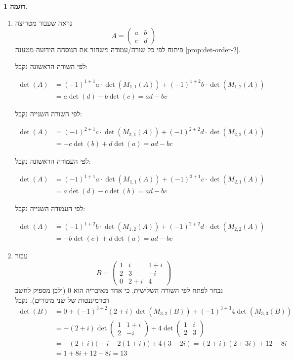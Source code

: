 \documentclass[12pt]{report}
\theoremstyle{plain}
\theoremstyle{definition}
\newtheorem{example}{דוגמה}[chapter]
\newcommand{\0}{\mathbf{0}}
\begin{document}
\begin{example}\
\begin{enumerate}[label=\alph*.]
\item 
נראה שעבור מטריצה
$$
A=\begin{pmatrix}
a & b \\
c & d
\end{pmatrix}
$$
פיתוח לפי כל שורה/עמודה משחזר את הנוסחה הידועה מטענה
\ref{prop:det-order-2}.

לפי השורה הראשונה נקבל:

$$
\begin{aligned}
\det(A)&=(-1)^{1+1}a\cdot \det(M_{1,1}(A))+(-1)^{1+2}b\cdot \det(M_{1,2}(A))\\
&=a\det(d)-b\det(c)=ad-bc
\end{aligned}
$$

לפי השורה השנייה נקבל:

$$
\begin{aligned}
\det(A)&=(-1)^{2+1}c\cdot \det(M_{2,1}(A))+(-1)^{2+2}d\cdot \det(M_{2,2}(A))\\
&=-c\det(b)+d\det(a)=ad-bc
\end{aligned}
$$

לפי העמודה הראשונה נקבל:

$$
\begin{aligned}
\det(A)&=(-1)^{1+1}a\cdot \det(M_{1,1}(A))+(-1)^{2+1}c\cdot \det(M_{2,1}(A))\\
&=a\det(d)-c\det(b)=ad-bc
\end{aligned}
$$

לפי העמודה השנייה נקבל:

$$
\begin{aligned}
\det(A)&=(-1)^{1+2}b\cdot \det(M_{1,2}(A))+(-1)^{2+2}d\cdot \det(M_{2,2}(A))\\
&=-b\det(c)+d\det(a)=ad-bc
\end{aligned}
$$

\item 
עבור
$$
B=\begin{pmatrix}
1 & i & 1+i \\
2 & 3 & -i \\
0 & 2+i & 4
\end{pmatrix}
$$
נבחר לפתח לפי השורה השלישית, כי אחד מאיבריה הוא 
$0$
(ולכן מספיק לחשב דטרמיננטות של שני מינורים). נקבל
$$
\begin{aligned}
\det(B)&=0+(-1)^{3+2}(2+i)\det(M_{3,2}(B))+(-1)^{3+3}4\det(M_{3,3}(B)) \\
&=-(2+i)\det\!\begin{pmatrix}
1 & 1+i \\
2 & -i
\end{pmatrix}+4\det\!\begin{pmatrix}
1 & i \\
2 & 3
\end{pmatrix}\\
&=-(2+i)\bigl(-i-2(1+i)\bigr)+4(3-2i)=(2+i)(2+3i)+12-8i\\
&=1+8i+12-8i=13
\end{aligned}
$$


\end{enumerate}
\end{example}
\end{document}
